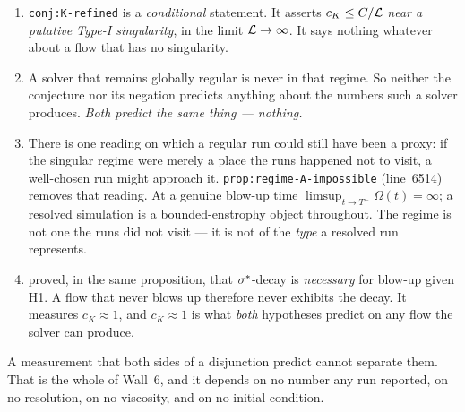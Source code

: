 \begin{enumerate}[leftmargin=2.2em]
\item \texttt{conj:K-refined} is a \emph{conditional} statement. It asserts
  \(c_K\le C/\mathcal{L}\) \emph{near a putative Type-I singularity}, in the limit
  \(\mathcal{L}\to\infty\). It says nothing whatever about a flow that has no
  singularity.
\item A solver that remains globally regular is never in that regime. So
  neither the conjecture nor its negation predicts anything about the numbers
  such a solver produces. \emph{Both predict the same thing --- nothing.}
\item There is one reading on which a regular run could still have been a
  proxy: if the singular regime were merely a place the runs happened not to
  visit, a well-chosen run might approach it.
  \texttt{prop:regime-A-impossible} (line~6514) removes that reading. At a
  genuine blow-up time \(\limsup_{t\to T^-}\Omega(t)=\infty\); a resolved
  simulation is a bounded-enstrophy object throughout. The regime is not one
  the runs did not visit --- it is not of the \emph{type} a resolved run
  represents.
\item {} proved, in the same proposition, that \(\sigma^{*}\)-decay is
  \emph{necessary} for blow-up given H1. A flow that never blows up therefore
  never exhibits the decay. It measures \(c_K\approx1\), and
  \(c_K\approx1\) is what \emph{both} hypotheses predict on any flow the
  solver can produce.
\end{enumerate}

A measurement that both sides of a disjunction predict cannot separate them.
That is the whole of Wall~6, and it depends on no number any run reported, on
no resolution, on no viscosity, and on no initial condition.


